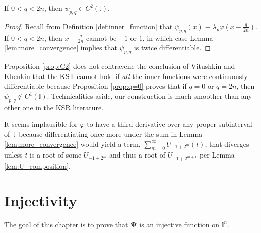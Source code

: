 \begin{proposition}
  \label{prop:C2}
  If $0 < q < 2n$, then $\psi_{p,q} \in C^2\left(\mathbb{I}\right)$.
\end{proposition}
\begin{proof}
  Recall from Definition \ref{def:inner_function} that $\psi_{p,q}\left(x\right) \equiv \lambda_p \varphi\left(x - \frac{q}{2n}\right)$. If $0 < q < 2n$, then $x - \frac{q}{2n}$ cannot be $-1$ or $1$, in which case Lemma \ref{lem:more_convergence} implies that $\psi_{p,q}$ is twice differentiable.
\end{proof}
\begin{remark*}
  Proposition \ref{prop:C2} does not contravene the conclusion of Vitushkin and Khenkin that the KST cannot hold if \emph{all} the inner functions were continuously differentiable because Proposition \ref{prop:q=0} proves that if $q = 0$ or $q = 2n$, then $\psi_{p,q} \notin C^1\left(\mathbb{I}\right)$. Technicalities aside, our construction is much smoother than any other one in the KSR literature.
\end{remark*}
\begin{remark*}
  It seems implausible for $\varphi$ to have a third derivative over any proper subinterval of $\mathbb{T}$ because differentiating once more under the sum in Lemma \ref{lem:more_convergence} would yield a term, $\sum\limits_{m = 0}^\infty U_{-1 + 2^m}\left(t\right)$, that diverges unless $t$ is a root of some $U_{-1 + 2^m}$ and thus a root of $U_{-1 + 2^{m + 1}}$ per Lemma \ref{lem:U_composition}.
\end{remark*}

\chapter{Injectivity}\label{ch:Injectivity}

The goal of this chapter is to prove that $\boldsymbol{\Psi}$ is an injective function on $\mathbb{I}^n$.

